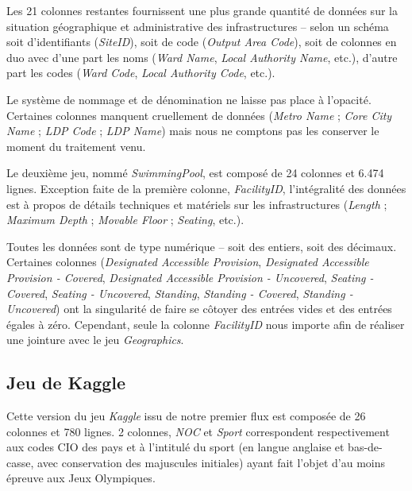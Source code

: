 \documentclass[hidelinks, 12pt]{report}
\begin{document}
Les 21 colonnes restantes fournissent une plus grande quantité de données sur la situation géographique et administrative des infrastructures -- selon un schéma soit d'identifiants (\textit{SiteID}), soit de code (\textit{Output Area Code}), soit de colonnes en duo avec d'une part les noms (\textit{Ward Name}, \textit{Local Authority Name}, etc.), d'autre part les codes (\textit{Ward Code}, \textit{Local Authority Code}, etc.).

Le système de nommage et de dénomination ne laisse pas place à l'opacité. Certaines colonnes manquent cruellement de données (\textit{Metro Name} ; \textit{Core City Name} ; \textit{LDP Code} ; \textit{LDP Name}) mais nous ne comptons pas les conserver le moment du traitement venu.
\newline

Le deuxième jeu, nommé \textit{SwimmingPool}, est composé de 24 colonnes et 6.474 lignes. Exception faite de la première colonne, \textit{FacilityID}, l'intégralité des données est à propos de détails techniques et matériels sur les infrastructures (\textit{Length} ; \textit{Maximum Depth} ; \textit{Movable Floor} ; \textit{Seating}, etc.).

Toutes les données sont de type numérique -- soit des entiers, soit des décimaux. Certaines colonnes (\textit{Designated Accessible Provision}, \textit{Designated Accessible Provision - Covered}, \textit{Designated Accessible Provision - Uncovered}, \textit{Seating - Covered}, \textit{Seating - Uncovered}, \textit{Standing}, \textit{Standing - Covered}, \textit{Standing - Uncovered}) ont la singularité de faire se côtoyer des entrées vides et des entrées égales à zéro. Cependant, seule la colonne \textit{FacilityID} nous importe afin de réaliser une jointure avec le jeu \textit{Geographics}.





%





\subsection{Jeu de Kaggle}

Cette version du jeu \textit{Kaggle} issu de notre premier flux est composée de 26 colonnes et 780 lignes. 2 colonnes, \textit{NOC} et \textit{Sport} correspondent respectivement aux codes CIO des pays et à l'intitulé du sport (en langue anglaise et bas-de-casse, avec conservation des majuscules initiales) ayant fait l'objet d'au moins épreuve aux Jeux Olympiques.
\end{document}
